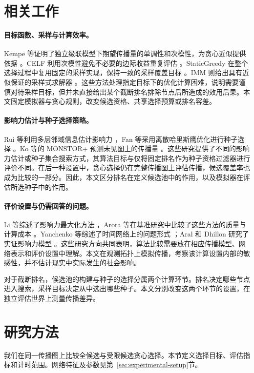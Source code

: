 \documentclass[smallextended]{svjour3}
\begin{document}
\section{相关工作}
\paragraph{目标函数、采样与计算效率。}Kempe 等证明了独立级联模型下期望传播量的单调性和次模性，为贪心近似提供依据 \cite{ref1}。CELF 利用次模性避免不必要的边际收益重复评估 \cite{ref7}。StaticGreedy 在整个选择过程中复用固定的采样实现，保持一致的采样覆盖目标 \cite{ref8}。IMM 则给出具有近似保证的采样式求解器 \cite{ref2}。这些方法处理指定目标下的优化计算困难，说明需要谨慎对待采样目标，但并未直接给出某个截断排名排除节点后所造成的效用后果。本文固定模拟器与贪心规则，改变候选资格、共享选择预算或排名容差。

\paragraph{影响力估计与种子选择策略。}Rui 等利用多层邻域信息估计影响力 \cite{ref12}，Fan 等采用离散哈里斯鹰优化进行种子选择 \cite{ref13}。Ko 等的 MONSTOR+ 预测未见图上的传播量 \cite{ref19}。这些研究提供了不同的影响力估计或种子集合搜索方式，其算法目标与仅将固定排名作为种子资格过滤器进行评价不同。在后一种设置中，贪心选择仍在完整传播图上评估传播，候选覆盖率也成为比较的一部分。因此，本文区分排名在定义候选池中的作用，以及模拟器在评估所选种子中的作用。

\paragraph{评价设置与仍需回答的问题。}Li 等综述了影响力最大化方法 \cite{ref9}，Arora 等在基准研究中比较了这些方法的质量与计算成本 \cite{ref16}。Yanchenko 等综述了时间网络上的问题形式 \cite{ref11}；Aral 和 Dhillon 研究了实证影响力模型 \cite{ref15}。这些研究方向共同表明，算法比较需要放在相应传播模型、网络表示和评价设置中理解。本文在观测拓扑上模拟传播，考察该计算设置内部的敏感性，并不估计现实中实际发生的社会影响。

对于截断排名，候选池的构建与种子的选择分属两个计算环节。排名决定哪些节点进入搜索，采样目标决定从中选出哪些种子。本文分别改变这两个环节的设置，在独立评估世界上测量传播差异。

\section{研究方法}
我们在同一传播图上比较全候选与受限候选贪心选择。本节定义选择目标、评估指标和计时范围。网络特征及参数见第~\ref{sec:experimental-setup}节。
\end{document}
